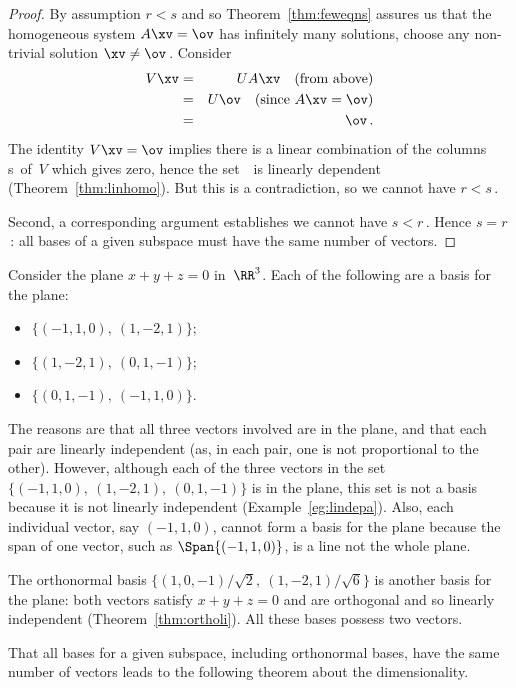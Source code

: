 \begin{proof}
By assumption \(r<s\) and so Theorem~\ref{thm:feweqns} assures us that the homogeneous system \(A\xv=\ov\) has infinitely many solutions, choose any non-trivial solution \(\xv\neq\ov\)\,.
Consider 
\begin{eqnarray*}
V\xv&=& UA\xv\quad(\text{from above})
\\&=&U\ov\quad(\text{since }A\xv=\ov)
\\&=&\ov\,.
\end{eqnarray*}
The identity \(V\xv=\ov\) implies there is a linear combination of the columns \hlist\vv s\ of~\(V\) which gives zero, hence the set~\cV\ is linearly dependent (Theorem~\ref{thm:linhomo}).  
But this is a contradiction, so we cannot have \(r<s\)\,.

Second, a corresponding argument establishes we cannot have \(s<r\)\,.
Hence \(s=r\)\,: all bases of a given subspace must have the same number of vectors.
\end{proof}



\begin{example} \label{eg:samedi}
Consider the plane \(x+y+z=0\) in~\(\RR^3\).
Each of the following are a basis for the plane:
\begin{itemize}
\item \(\{(-1,1,0),\ (1,-2,1)\}\);
\item \(\{(1,-2,1),\ (0,1,-1)\}\); 
\item \(\{(0,1,-1),\ (-1,1,0)\}\).
\end{itemize}
The reasons are that all three vectors involved are in the plane, and that each pair are linearly independent (as, in each pair, one is not proportional to the other).
However, although each of the three vectors in the set \(\{(-1,1,0),\ (1,-2,1),\ (0,1,-1)\}\) is in the plane, this set is not a basis because it is not linearly independent (Example~\ref{eg:lindepa}).
Also, each individual vector, say \((-1,1,0)\), cannot form a basis for the plane because the span of one vector, such as \(\Span\{(-1,1,0)\}\), is a line not the whole plane.

The orthonormal basis \(\big\{(1,0,-1)/\sqrt2,\ (1,-2,1)/\sqrt6\big\}\) is another basis for the plane: both vectors satisfy \(x+y+z=0\) and are orthogonal and so linearly independent (Theorem~\ref{thm:ortholi}).  
All these bases possess two vectors.
\end{example}

That all bases for a given subspace, including orthonormal bases, have the same number of vectors leads to the following theorem about the dimensionality.

